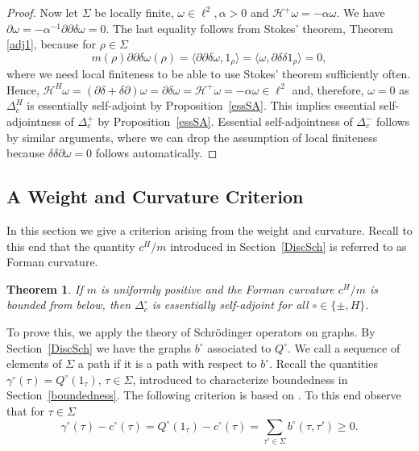 \documentclass[10pt]{amsart}
\newtheorem{theorem}{Theorem}[section]
\theoremstyle{definition}
\renewcommand{\bullet}{{\circ}}
\begin{document}
\begin{proof}
{Now let $\Sigma$ be locally finite, $\omega\in\ell^2,\alpha>0$ and $\mathcal{H}^+\omega = -\alpha\omega.$ We have $\partial\omega = -\alpha^{-1}\partial\partial\delta\omega = 0.$ The last equality follows from Stokes' theorem, Theorem \ref{adj1}, because for $\rho\in\Sigma$
$$m(\rho)\partial\partial\delta\omega(\rho) = \langle\partial\partial\delta\omega,1_\rho\rangle = \langle\omega,\partial\delta\delta1_\rho\rangle = 0,$$
where we need local finiteness to be able to use Stokes' theorem sufficiently often.
Hence, $\mathcal{H}^H\omega = (\partial\delta+\delta\partial)\omega=\partial\delta\omega=\mathcal{H}^+\omega = -\alpha\omega\in\ell^{2} $ and, therefore, $\omega=0$ as $\Delta^{H}_{c}$ is essentially self-adjoint by Proposition~\ref{essSA}. This implies essential self-adjointness of $\Delta^{+}_{c}$
by Proposition~\ref{essSA}.
Essential self-adjointness of $\Delta^{-}_{c}$ follows by similar arguments, where we can drop the assumption of local finiteness because $\delta\delta\partial\omega = 0$ follows automatically.}
\end{proof}

\subsection{A Weight and Curvature Criterion}
In this section we give a criterion arising from the weight and curvature. Recall to this end that the quantity $c^{H}/m$ introduced in Section~\ref{DiscSch} is referred to as Forman curvature.

\begin{theorem}\label{esssa1}
	If $m$ is uniformly positive and the Forman curvature $c^{H}/m$ is bounded from below,     then $\Delta^\bullet_{c}$ is essentially self-adjoint for all $\bullet\in\{\pm,H\}$.
\end{theorem}


To prove this, we apply the theory of Schrödinger operators on graphs. By Section~\ref{DiscSch} we have the graphs $b^{\bullet}$ associated to $Q^{\bullet}$. We call a sequence of elements of $\Sigma$ a path if it is a path with respect to $b^{\bullet}$.
Recall the quantities $\gamma^{\bullet}(\tau)=Q^{\bullet}(1_{\tau})$, $\tau\in \Sigma$, introduced to characterize boundedness in Section~\ref{boundedness}. The following criterion is based on \cite{Go,GKS}. To this end observe that for $\tau\in\Sigma$
 $$\gamma^\bullet(\tau)-c^\bullet (\tau)=Q^{\bullet}(1_{\tau})-c^{\bullet}(\tau)=\sum_{\tau'\in\Sigma}b^{\bullet}(\tau,\tau')\ge0.$$
\end{document}
